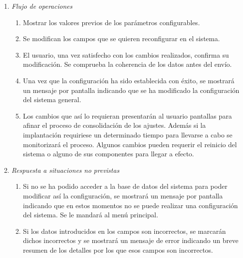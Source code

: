 \begin{enumerate}
		\item \textit{Flujo de operaciones}
		\begin{enumerate}
			\item Mostrar los valores previos de los parámetros configurables.
			\item Se modifican los campos que se quieren reconfigurar en el sistema.
			\item El usuario, una vez satisfecho con los cambios realizados, confirma su modificación. Se comprueba la coherencia de los datos antes del envío. 
			\item Una vez que la configuración ha sido establecida con éxito, se mostrará un mensaje por pantalla indicando que se ha modificado la configuración del sistema general.
			\item Los cambios que así lo requieran presentarán al usuario pantallas para afinar el proceso de consolidación de los ajustes. Además si la implantación requiriese un determinado tiempo para llevarse a cabo se monitorizará el proceso. Algunos cambios pueden requerir el reinicio del sistema o alguno de sus componentes para llegar a efecto.
		\end{enumerate}
		\item \textit{Respuesta a situaciones no previstas}
		\begin{enumerate}
		  \item Si no se ha podido acceder a la base de datos del sistema para poder modificar así la configuración, se mostrará un mensaje por pantalla indicando que en estos momentos no se puede realizar una configuración del sistema. Se le mandará al menú principal.
			\item Si los datos introducidos en los campos son incorrectos, se marcarán dichos incorrectos y se mostrará un mensaje de error indicando un breve resumen de los detalles por los que esos campos son incorrectos.
		\end{enumerate}

	\end{enumerate}

